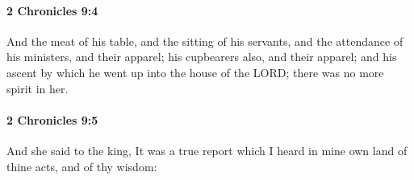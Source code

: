 		\paragraph{2 Chronicles 9:4} %
			\label{2CHRONICLES-9-4}

			And the meat of his table, and the sitting of his servants, and the attendance of his ministers, and their apparel; his cupbearers also, and their apparel; and his ascent by which he went up into the house of the LORD; there was no more spirit in her.


		\paragraph{2 Chronicles 9:5} %
			\label{2CHRONICLES-9-5}

			And she said to the king, It was a true report which I heard in mine own land of thine acts, and of thy wisdom:

